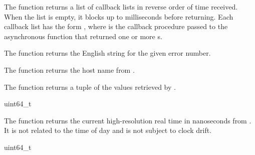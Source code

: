 The  function returns a list of callback
lists in reverse order of time received. When the list is empty, it
blocks up to  milliseconds before returning. Each
callback list has the form ,
where  is the callback procedure passed to the
asynchronous function that returned one or more s.

\begin{function}
\end{function}

The  function returns the English string
for the given error number.

\begin{function}
\end{function}

The  function returns the host name from
.

\begin{function}
\end{function}

The  function returns a  tuple
of the values retrieved by .

\label{uname-tuple}
\begin{tuple}\end{tuple}\antipar
\begin{argtbl}
\end{argtbl}

\begin{function}
  uint64\_t 
\end{function}

The  function returns the current
high-resolution real time in nanoseconds from . It is
not related to the time of day and is not subject to clock drift.

\begin{function}
  uint64\_t 
\end{function}

